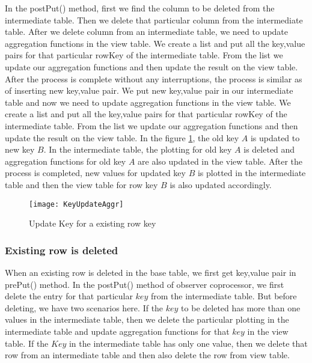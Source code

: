 \documentclass[11pt,a4paper,bibtotoc,idxtotoc,headsepline,footsepline,footexclude,BCOR12mm,DIV13]{scrbook}
\begin{document}
In the postPut() method, first we find the column to be deleted from the intermediate table. Then we delete that particular column from the intermediate table. After we delete column from an intermediate table, we need to update aggregation functions in the view table. We create a list and put all the key,value pairs for that particular rowKey of the intermediate table. From the list we update our aggregation functions and then update the result on the view table. After the process is complete without any interruptions, the process is similar as of inserting new key,value pair. We put new key,value pair in our intermediate table and now we need to update aggregation functions in the view table. We create a list and put all the key,value pairs for that particular rowKey of the intermediate table. From the list we update our aggregation functions and then update the result on the view table. In the figure \ref{sec:updateKeyforexistingrow}, the old key $A$ is updated to new key $B$. In the intermediate table, the plotting for old key $A$ is deleted and aggregation functions for old key $A$ are also updated in the view table. After the process is completed, new values for updated key $B$ is plotted in the intermediate table and then the view table for row key $B$ is also updated accordingly.

\begin{figure}
    \centering
    \texttt{[image: KeyUpdateAggr]}
    \caption{Update Key for a existing row key}
    \label{sec:updateKeyforexistingrow}
    
\end{figure} 

\newpage
\subsubsection{Existing row is deleted}
\label{subsubsec:rowdelete}

When an existing row is deleted in the base table, we first get key,value pair in prePut() method. In the postPut() method of observer coprocessor, we first delete the entry for that particular $key$ from the intermediate table. But before deleting, we have two scenarios here. If the $key$ to be deleted has more than one values in the intermediate table, then we delete the particular plotting in the intermediate table and update aggregation functions for that $key$ in the view table. If the $Key$ in the intermediate table has only one value, then we delete that row from an intermediate table and then also delete the row from view table.
\end{document}
